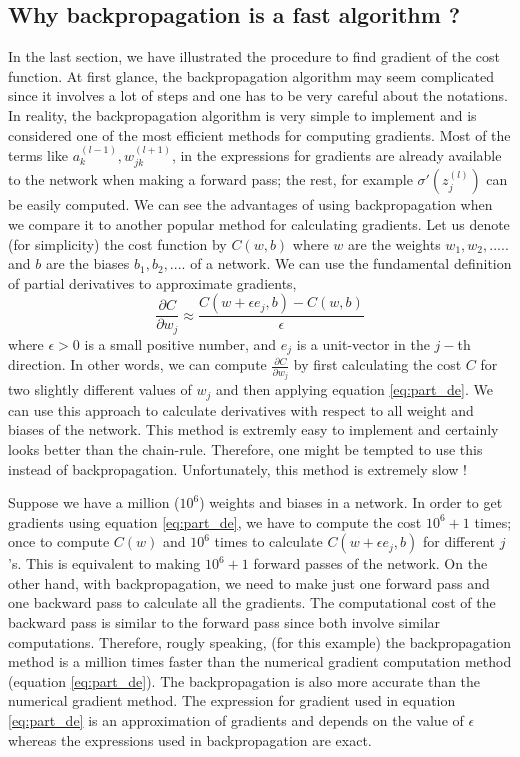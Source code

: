 \subsection{Why backpropagation is a fast algorithm ?}
In the last section, we have illustrated the procedure to find gradient of the cost function. At first glance, the backpropagation algorithm may
seem complicated since it involves a lot of steps and one has to be very careful about the notations. In reality, the backpropagation algorithm is very 
simple to implement and is considered one of the most efficient methods for computing gradients. Most of the terms like $a_k^{(l-1)}, w_{jk}^{(l+1)}$, in 
the expressions for gradients are already available to the network when making a forward pass; the rest, for example $\sigma'(z_j^{(l)})$ can be easily computed.
We can see the advantages of using backpropagation when we compare it to another popular method for calculating gradients. Let us denote (for simplicity) the cost function by $C(w,b)$ 
where $w$ are the weights $w_1,w_2,.....$ and $b$ are the biases $b_1,b_2,....$ of a network. We can use the fundamental definition of partial derivatives to approximate gradients,
\begin{equation}
    \label{eq:part_de}
    \frac{\partial C}{\partial w_j} \approx \frac{C(w + \epsilon e_j, b) - C(w,b)}{\epsilon}
\end{equation}
where $\epsilon > 0$ is a small positive number, and $e_j$ is a unit-vector in the $j-$th direction. In other words, we can compute $\frac{\partial C}{\partial w_j}$ by first 
calculating the cost $C$ for two slightly  different values of $w_j$ and then applying equation \eqref{eq:part_de}. We can use this approach to 
calculate derivatives with respect to all weight and biases of the network. This method is extremly easy to implement and certainly looks better than the chain-rule. Therefore, one
might be tempted to use this instead of backpropagation. Unfortunately, this method is extremely slow ! 

Suppose we have a million ($10^6$) weights and biases in a network. In order to get 
gradients using equation \eqref{eq:part_de}, we have to compute the cost $10^6 + 1$ times; once to compute $C(w)$ and $10^6$ times to calculate $C(w + \epsilon e_j, b)$ for different $j$'s. This is equivalent to making
$10^6 +1$ forward passes of the network. On the other hand, with backpropagation, we need to make just one forward pass and one backward pass to calculate all the gradients. The computational cost 
of the backward pass is similar to the forward pass since both involve similar computations. Therefore, rougly speaking, (for this example) the backpropagation method is a million times faster than the numerical gradient computation method (equation \eqref{eq:part_de}).
The backpropagation is also more accurate than the numerical gradient method. The expression for gradient used in equation \eqref{eq:part_de} is an approximation of gradients and depends on the value of $\epsilon$ whereas the expressions used in backpropagation are exact.
